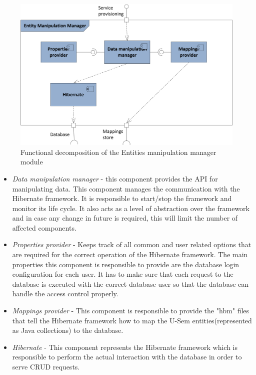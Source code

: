 \begin{figure}[h!]
  \centering
  	\includegraphics[scale=0.7]{storage/functional/func_manip.png}
  \caption{Functional decomposition of the Entities manipulation manager module}
  \label{fig:storageFuncManip}
\end{figure}

\begin{itemize}
	\item \textit{Data manipulation manager} - this component provides the API for manipulating data. This component manages the communication with the Hibernate framework. It is responsible to start/stop the framework and monitor its life cycle. It also acts as a level of abstraction over the framework and in case any change in future is required, this will limit the number of affected components.
	
	\item \textit{Properties provider} - Keeps track of all common and user related options that are required for the correct operation of the Hibernate framework. The main properties this component is responsible to provide are the database login configuration for each user. It has to make sure that each request to the database is executed with the correct database user so that the database can handle the access control properly.
	
	\item \textit{Mappings provider} - This component is responsible to provide the "hbm" files that tell the Hibernate framework how to map the U-Sem entities(represented as Java collections) to the database.
	
	\item \textit{Hibernate} - This component represents the Hibernate framework which is responsible to perform the actual interaction with the database in order to serve CRUD requests.  
\end{itemize}

